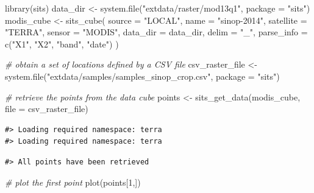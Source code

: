 \documentclass[a4paper,]{tufte-book}
\newenvironment{Shaded}{}{}
\newcommand{\AttributeTok}[1]{\textcolor[rgb]{0.49,0.56,0.16}{#1}}
\newcommand{\CommentTok}[1]{\textcolor[rgb]{0.38,0.63,0.69}{\textit{#1}}}
\newcommand{\DecValTok}[1]{\textcolor[rgb]{0.25,0.63,0.44}{#1}}
\newcommand{\FunctionTok}[1]{\textcolor[rgb]{0.02,0.16,0.49}{#1}}
\newcommand{\NormalTok}[1]{#1}
\newcommand{\OtherTok}[1]{\textcolor[rgb]{0.00,0.44,0.13}{#1}}
\newcommand{\StringTok}[1]{\textcolor[rgb]{0.25,0.44,0.63}{#1}}
\begin{document}
\begin{Shaded}
\begin{Highlighting}[]
\FunctionTok{library}\NormalTok{(sits)}
\NormalTok{data\_dir }\OtherTok{\textless{}{-}} \FunctionTok{system.file}\NormalTok{(}\StringTok{"extdata/raster/mod13q1"}\NormalTok{, }\AttributeTok{package =} \StringTok{"sits"}\NormalTok{)}
\NormalTok{modis\_cube }\OtherTok{\textless{}{-}} \FunctionTok{sits\_cube}\NormalTok{(}
    \AttributeTok{source =} \StringTok{"LOCAL"}\NormalTok{,}
    \AttributeTok{name =} \StringTok{"sinop{-}2014"}\NormalTok{,}
    \AttributeTok{satellite =} \StringTok{"TERRA"}\NormalTok{,}
    \AttributeTok{sensor =} \StringTok{"MODIS"}\NormalTok{,}
    \AttributeTok{data\_dir =}\NormalTok{ data\_dir,}
    \AttributeTok{delim =} \StringTok{"\_"}\NormalTok{,}
    \AttributeTok{parse\_info =} \FunctionTok{c}\NormalTok{(}\StringTok{"X1"}\NormalTok{, }\StringTok{"X2"}\NormalTok{, }\StringTok{"band"}\NormalTok{, }\StringTok{"date"}\NormalTok{)}
\NormalTok{)}

\CommentTok{\# obtain a set of locations defined by a CSV file}
\NormalTok{csv\_raster\_file }\OtherTok{\textless{}{-}} \FunctionTok{system.file}\NormalTok{(}\StringTok{"extdata/samples/samples\_sinop\_crop.csv"}\NormalTok{,}
                               \AttributeTok{package =} \StringTok{"sits"}\NormalTok{)}

\CommentTok{\# retrieve the points from the data cube}
\NormalTok{points }\OtherTok{\textless{}{-}} \FunctionTok{sits\_get\_data}\NormalTok{(modis\_cube, }\AttributeTok{file =}\NormalTok{ csv\_raster\_file)}
\end{Highlighting}
\end{Shaded}

\begin{verbatim}
#> Loading required namespace: terra
#> Loading required namespace: terra
\end{verbatim}

\begin{verbatim}
#> All points have been retrieved
\end{verbatim}

\begin{Shaded}
\begin{Highlighting}[]
\CommentTok{\# plot the first point}
\FunctionTok{plot}\NormalTok{(points[}\DecValTok{1}\NormalTok{,])}
\end{Highlighting}
\end{Shaded}
\end{document}

